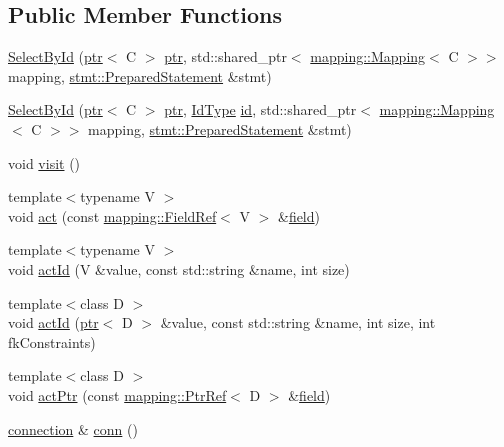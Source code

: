 \subsection*{Public Member Functions}
\begin{DoxyCompactItemize}
\item 
\hyperlink{classdbo_1_1action_1_1_select_by_id_a6b7285e0f00b4cd5f0e9cc7502baf9b9}{Select\+By\+Id} (\hyperlink{classdbo_1_1ptr}{ptr}$<$ C $>$ \hyperlink{classdbo_1_1ptr}{ptr}, std\+::shared\+\_\+ptr$<$ \hyperlink{classdbo_1_1mapping_1_1_mapping}{mapping\+::\+Mapping}$<$ C $>$$>$ mapping, \hyperlink{classdbo_1_1stmt_1_1_prepared_statement}{stmt\+::\+Prepared\+Statement} \&stmt)
\item 
\hyperlink{classdbo_1_1action_1_1_select_by_id_a4e8428400825076ddd90c995cc6cdfcb}{Select\+By\+Id} (\hyperlink{classdbo_1_1ptr}{ptr}$<$ C $>$ \hyperlink{classdbo_1_1ptr}{ptr}, \hyperlink{classdbo_1_1action_1_1_select_by_id_a00c65e230f8b64b90713042403032403}{Id\+Type} \hyperlink{namespacedbo_a8d25907296ae8360b3120b7492022c1d}{id}, std\+::shared\+\_\+ptr$<$ \hyperlink{classdbo_1_1mapping_1_1_mapping}{mapping\+::\+Mapping}$<$ C $>$$>$ mapping, \hyperlink{classdbo_1_1stmt_1_1_prepared_statement}{stmt\+::\+Prepared\+Statement} \&stmt)
\item 
void \hyperlink{classdbo_1_1action_1_1_select_by_id_a5567027d84c59654bcf83f7dd5c175ee}{visit} ()
\item 
{\footnotesize template$<$typename V $>$ }\\void \hyperlink{classdbo_1_1action_1_1_select_by_id_a835e329a94a4f3a1b3c6dff876a3a06d}{act} (const \hyperlink{classdbo_1_1mapping_1_1_field_ref}{mapping\+::\+Field\+Ref}$<$ V $>$ \&\hyperlink{namespacedbo_ad1f50f02cb050acf946807959252a93f}{field})
\item 
{\footnotesize template$<$typename V $>$ }\\void \hyperlink{classdbo_1_1action_1_1_select_by_id_ade0aeba44536864743ad2f12536b7094}{act\+Id} (V \&value, const std\+::string \&name, int size)
\item 
{\footnotesize template$<$class D $>$ }\\void \hyperlink{classdbo_1_1action_1_1_select_by_id_a6e71df03fb61fe01363a6db4f86eb637}{act\+Id} (\hyperlink{classdbo_1_1ptr}{ptr}$<$ D $>$ \&value, const std\+::string \&name, int size, int fk\+Constraints)
\item 
{\footnotesize template$<$class D $>$ }\\void \hyperlink{classdbo_1_1action_1_1_select_by_id_a832cf6f330506ea92a64454a3fe45626}{act\+Ptr} (const \hyperlink{classdbo_1_1mapping_1_1_ptr_ref}{mapping\+::\+Ptr\+Ref}$<$ D $>$ \&\hyperlink{namespacedbo_ad1f50f02cb050acf946807959252a93f}{field})
\item 
\hyperlink{classdbo_1_1connection}{connection} \& \hyperlink{classdbo_1_1action_1_1_select_by_id_ad5a0b639d9d4084e6ba34cf919c530ae}{conn} ()
\end{DoxyCompactItemize}
